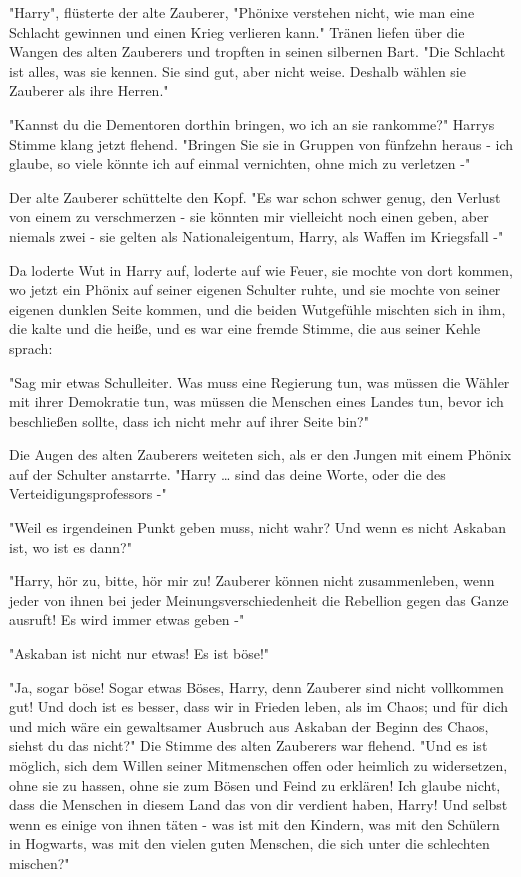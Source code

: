 {"Harry", flüsterte der alte Zauberer, "Phönixe verstehen nicht, wie man eine Schlacht gewinnen und einen Krieg verlieren kann." Tränen liefen über die Wangen des alten Zauberers und tropften in seinen silbernen Bart. "Die Schlacht ist alles, was sie kennen. Sie sind gut, aber nicht weise. Deshalb wählen sie Zauberer als ihre Herren."

"Kannst du die Dementoren dorthin bringen, wo ich an sie rankomme?" Harrys Stimme klang jetzt flehend. "Bringen Sie sie in Gruppen von fünfzehn heraus - ich glaube, so viele könnte ich auf einmal vernichten, ohne mich zu verletzen -"

Der alte Zauberer schüttelte den Kopf. "Es war schon schwer genug, den Verlust von einem zu verschmerzen - sie könnten mir vielleicht noch einen geben, aber niemals zwei - sie gelten als Nationaleigentum, Harry, als Waffen im Kriegsfall -"

Da loderte Wut in Harry auf, loderte auf wie Feuer, sie mochte von dort kommen, wo jetzt ein Phönix auf seiner eigenen Schulter ruhte, und sie mochte von seiner eigenen dunklen Seite kommen, und die beiden Wutgefühle mischten sich in ihm, die kalte und die heiße, und es war eine fremde Stimme, die aus seiner Kehle sprach:

"Sag mir etwas Schulleiter. Was muss eine Regierung tun, was müssen die Wähler mit ihrer Demokratie tun, was müssen die Menschen eines Landes tun, bevor ich beschließen sollte, dass ich nicht mehr auf ihrer Seite bin?"

Die Augen des alten Zauberers weiteten sich, als er den Jungen mit einem Phönix auf der Schulter anstarrte. "Harry … sind das deine Worte, oder die des Verteidigungsprofessors -"

"Weil es irgendeinen Punkt geben muss, nicht wahr? Und wenn es nicht Askaban ist, wo ist es dann?"

"Harry, hör zu, bitte, hör mir zu! Zauberer können nicht zusammenleben, wenn jeder von ihnen bei jeder Meinungsverschiedenheit die Rebellion gegen das Ganze ausruft! Es wird immer etwas geben -"

"Askaban ist nicht nur etwas! Es ist böse!"

"Ja, sogar böse! Sogar etwas Böses, Harry, denn Zauberer sind nicht vollkommen gut! Und doch ist es besser, dass wir in Frieden leben, als im Chaos; und für dich und mich wäre ein gewaltsamer Ausbruch aus Askaban der Beginn des Chaos, siehst du das nicht?" Die Stimme des alten Zauberers war flehend. "Und es ist möglich, sich dem Willen seiner Mitmenschen offen oder heimlich zu widersetzen, ohne sie zu hassen, ohne sie zum Bösen und Feind zu erklären! Ich glaube nicht, dass die Menschen in diesem Land das von dir verdient haben, Harry! Und selbst wenn es einige von ihnen täten - was ist mit den Kindern, was mit den Schülern in Hogwarts, was mit den vielen guten Menschen, die sich unter die schlechten mischen?"

}
